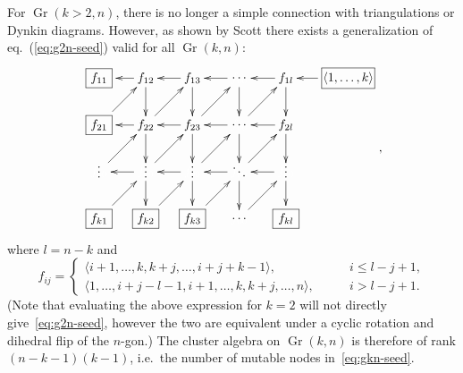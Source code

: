 \documentclass[11pt]{article}
\DeclareMathOperator{\Gr}{Gr}
\def\ket#1{\langle #1 \rangle}
\begin{document}
For $\Gr(k>2,n)$, there is no longer a simple connection with triangulations or Dynkin diagrams. However, as shown by Scott \cite{1088.22009} there exists a generalization of eq.~(\ref{eq:g2n-seed}) valid for all $\Gr(k,n)$:
\begin{equation}\label{eq:gkn-seed}
\begin{gathered}
\begin{xy} 0;<-.5pt,0pt>:<0pt,-.5pt>::
	(-100,0) *+{\framebox[10ex]{$\ket{1,\ldots,k}$}} ="-1",
	(0,0) *+{f_{1l}} ="0",
	(75,0) *+{\color{white} f_{00}} ="1",
	(150,0) *+{f_{13}} ="2",
	(225,0) *+{f_{12}} ="3",
	(300,0) *+{\framebox[5ex]{$f_{11}$}} ="4",
	(0,75) *+{f_{2l}} ="5",
	(75,75) *+{\color{white} f_{00}} ="6",
	(150,75) *+{f_{23}} ="7",
	(225,75) *+{f_{22}} ="8",
	(300,75) *+{\framebox[5ex]{$f_{21}$}} ="9",
	(0,150) *+{\color{white} f_{00}} ="10",
	(75,150) *+{\color{white} f_{00}} ="11",
	(150,150) *+{\color{white} f_{00}} ="12",
	(225,150) *+{\color{white} f_{00}} ="13",
	(300,150) *+{\color{white} f_{00}} ="14",
	(0,225) *+{\framebox[5ex]{$f_{kl}$}} ="15",
	(75,225) *+{\color{white} f_{00}} ="16",
	(150,225) *+{\framebox[5ex]{$f_{k3}$}} ="17",
	(225,225) *+{\framebox[5ex]{$f_{k2}$}} ="18",
	(300,225) *+{\framebox[5ex]{$f_{k1}$}} ="19",
	(75,0) *+{\cdots} ="01",
	(75,75) *+{\cdots} ="06",
	(0,144) *+{\vdots} ="010",
	(75,144) *+{\ddots} ="011",
	(150,144) *+{\vdots} ="012",
	(225,144) *+{\vdots} ="013",
	(300,144) *+{\vdots} ="014",
	(75,225) *+{\cdots} ="016",
	"-1", {\ar"0"},
	"0", {\ar"1"},
	"0", {\ar"5"},
	"6", {\ar"0"},
	"1", {\ar"2"},
	"2", {\ar"3"},
	"2", {\ar"7"},
	"8", {\ar"2"},
	"3", {\ar"4"},
	"3", {\ar"8"},
	"9", {\ar"3"},
	"5", {\ar"6"},
	"6", {\ar"7"},
	"7", {\ar"8"},
	"8", {\ar"9"},
	"13", {\ar"7"},
	"7", {\ar"12"},
	"8", {\ar"13"},
	"5", {\ar"10"},
	"14", {\ar"8"},
	"10", {\ar"15"},
	"12", {\ar"17"},
	"19", {\ar"13"},
	"18", {\ar"12"},
	"13", {\ar"18"},
	"17", {\ar"11"},
	"16", {\ar"10"},
	"13", {\ar"14"},
	"12", {\ar"13"},
	"11", {\ar"12"},
	"10", {\ar"11"},
	"7", {\ar"1"},
	"11", {\ar"5"},
	"12", {\ar"6"},
	"1", {\ar"6"},
	"6", {\ar"11"},
	"11", {\ar"16"},
\end{xy}
\end{gathered} ,
\end{equation}
where $l=n-k$ and 
\begin{equation}
  f_{i j} =
  \begin{cases}
    \langle i+1, \dotsc, k, k+j, \dotsc, i+j+k-1\rangle, \qquad &i \leq l-j+1,\\
    \langle 1, \dotsc, i+j-l-1, i+1, \dotsc, k, k+j, \dotsc, n\rangle, \qquad &i >l-j+1.
  \end{cases}
\end{equation}
(Note that evaluating the above expression for $k=2$ will not directly give~\eqref{eq:g2n-seed}, however the two are equivalent under a cyclic rotation and dihedral flip of the $n$-gon.) The cluster algebra on $\Gr(k,n)$ is therefore of rank $(n-k-1)(k-1)$, i.e.~the number of mutable nodes in~\eqref{eq:gkn-seed}. 
\end{document}

